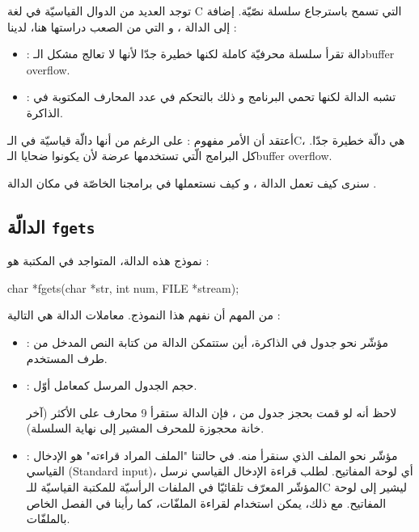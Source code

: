 توجد العديد من الدوال القياسيّة في لغة
\textenglish{C}
التي تسمح باسترجاع سلسلة نصّيّة. إضافة إلى الدالة
،
و التي من الصعب دراستها هنا، لدينا :

\begin{itemize}
  \item {}:
دالة تقرأ سلسلة محرفيّة كاملة لكنها خطيرة جدّا لأنها لا تعالج مشكل الـ\textenglish{buffer overflow}.
  \item {} :
 تشبه الدالة
لكنها تحمي البرنامج و ذلك بالتحكم في عدد المحارف المكتوبة في الذاكرة.
\end{itemize}

أعتقد أن الأمر مفهوم : على الرغم من أنها دالّة قياسيّة في الـ\textenglish{C}،
هي دالّة خطيرة  جدّا. كل البرامج الّتي تستخدمها عرضة لأن يكونوا ضحايا الـ\textenglish{buffer overflow}.

سنرى كيف تعمل الدالة
،
و كيف نستعملها في برامجنا الخاصّة في مكان الدالة
.

\subsection{الدالّة \texttt{fgets}}

نموذج هذه الدالة، المتواجد في المكتبة
هو :

\begin{Csource}
char *fgets(char *str, int num, FILE *stream);
\end{Csource}

من المهم أن نفهم هذا النموذج. معاملات الدالة هي التالية :

\begin{itemize}
  \item {} :
مؤشّر نحو جدول في الذاكرة، أين ستتمكن الدالة من كتابة النص المدخل من طرف المستخدم.
  \item {} :
حجم الجدول
المرسل كمعامل أوّل.

لاحظ أنه لو قمت بحجز جدول من
،
فإن الدالة
ستقرأ 9 محارف على الأكثر (آخر خانة محجوزة للمحرف
المشير إلى نهاية السلسلة).
  \item {} :
مؤشّر نحو الملف الذي سنقرأ منه. في حالتنا "الملف المراد قراءته" هو الإدخال القياسي
(\textenglish{Standard input})،
أي لوحة المفاتيح. لطلب قراءة الإدخال القياسي نرسل المؤشّر
المعرّف تلقائيّا في الملفات الرأسيّة للمكتبة القياسيّة للـ\textenglish{C}
ليشير إلى لوحة المفاتيح. مع ذلك، يمكن استخدام
لقراءة الملفّات، كما رأينا في الفصل الخاص بالملفّات.
\end{itemize}

